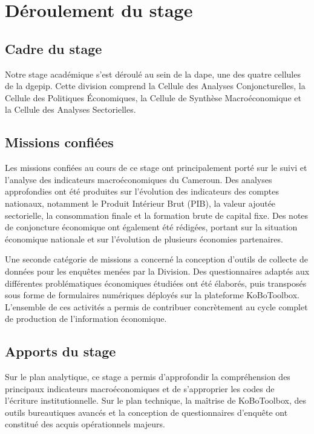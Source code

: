 \documentclass[12pt, a4paper, oneside]{report}
\begin{document}
\section{Déroulement du stage}

\subsection{Cadre du stage}

Notre stage académique s'est déroulé au sein de la \gls{dape}, une des quatre cellules de la \gls{dgepip}. Cette division comprend la Cellule des Analyses Conjoncturelles, la Cellule des Politiques Économiques, la Cellule de Synthèse Macroéconomique et la Cellule des Analyses Sectorielles.

\subsection{Missions confiées}

Les missions confiées au cours de ce stage ont principalement porté sur le suivi et l'analyse des indicateurs macroéconomiques du Cameroun. Des analyses approfondies ont été produites sur l'évolution des indicateurs des comptes nationaux, notamment le Produit Intérieur Brut (PIB), la valeur ajoutée sectorielle, la consommation finale et la formation brute de capital fixe. Des notes de conjoncture économique ont également été rédigées, portant sur la situation économique nationale et sur l'évolution de plusieurs économies partenaires.

Une seconde catégorie de missions a concerné la conception d'outils de collecte de données pour les enquêtes menées par la Division. Des questionnaires adaptés aux différentes problématiques économiques étudiées ont été élaborés, puis transposés sous forme de formulaires numériques déployés sur la plateforme KoBoToolbox. L'ensemble de ces activités a permis de contribuer concrètement au cycle complet de production de l'information économique.

\subsection{Apports du stage}

Sur le plan analytique, ce stage a permis d'approfondir la compréhension des principaux indicateurs macroéconomiques et de s'approprier les codes de l'écriture institutionnelle. Sur le plan technique, la maîtrise de KoBoToolbox, des outils bureautiques avancés et la conception de questionnaires d'enquête ont constitué des acquis opérationnels majeurs.
\end{document}
